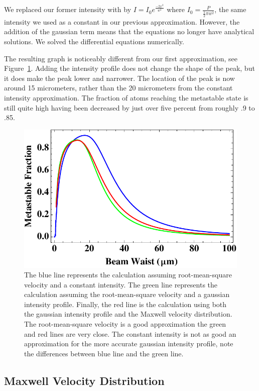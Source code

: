 \documentclass[prb,preprint]{revtex4-1}
\begin{document}
We replaced our former intensity with by $I = I_0 e^{\frac{-2 x^2}{w^2}}$ where $I_0 = \frac{P}{\frac{1}{2}\pi w^2}$, the same intensity we used as a constant in our previous approximation. However, the addition of the gaussian term means that the equations no longer have analytical solutions. We solved the differential equations numerically.

The resulting graph is noticeably different from our first approximation, see Figure~\ref{AllGraph}. Adding the intensity profile does not change the shape of the peak, but it does make the peak lower and narrower. The location of the peak is now around 15 micrometers, rather than the 20 micrometers from the constant intensity approximation.  The fraction of atoms reaching the metastable state is still quite high having been decreased by just over five percent from roughly .9 to .85.

\begin{figure}[h!]
\centering
\includegraphics[width=6in]{AllGraph.pdf}
\caption{The blue line represents the calculation assuming root-mean-square velocity and a constant intensity. The green line represents the calculation assuming the root-mean-square velocity and a gaussian intensity profile. Finally, the red line is the calculation using both the gaussian intensity profile and the Maxwell velocity distribution. The root-mean-square velocity is a good approximation the green and red lines are very close. The constant intensity is not as good an approximation for the more accurate gaussian intensity profile, note the differences between blue line and the green line.}
\label{AllGraph}
\end{figure}


\subsection{Maxwell Velocity Distribution}
\end{document}

